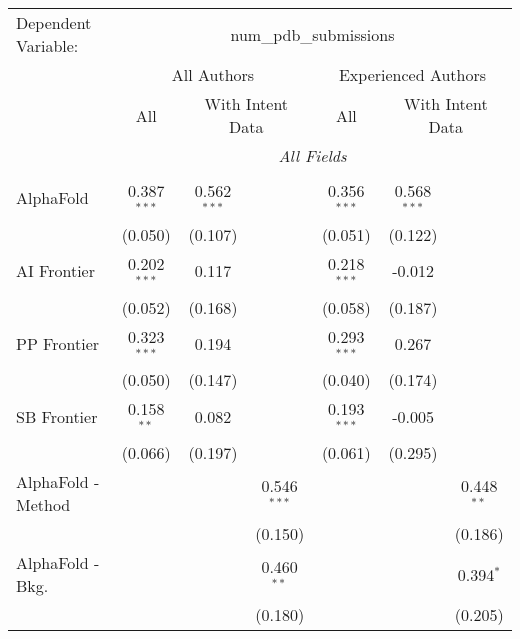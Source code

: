 \begingroup
\centering
\begin{tabular}{lcccccc}
   \tabularnewline \midrule \midrule
   Dependent Variable: & \multicolumn{6}{c}{num\_pdb\_submissions}\\
 & \multicolumn{3}{c}{All Authors} & \multicolumn{3}{c}{Experienced Authors} \\
\cmidrule(lr){2-4} \cmidrule(lr){5-7}
 & \multicolumn{1}{c}{All} & \multicolumn{2}{c}{With Intent Data} & \multicolumn{1}{c}{All} & \multicolumn{2}{c}{With Intent Data} \\
\cmidrule(lr){2-2} \cmidrule(lr){3-4} \cmidrule(lr){5-5} \cmidrule(lr){6-7}
 & \multicolumn{6}{c}{\textit{All Fields}} \\ \\
   AlphaFold            & 0.387$^{***}$ & 0.562$^{***}$ &               & 0.356$^{***}$ & 0.568$^{***}$ &   \\   
                        & (0.050)       & (0.107)       &               & (0.051)       & (0.122)       &   \\   
   AI Frontier          & 0.202$^{***}$ & 0.117         &               & 0.218$^{***}$ & -0.012        &   \\   
                        & (0.052)       & (0.168)       &               & (0.058)       & (0.187)       &   \\   
   PP Frontier          & 0.323$^{***}$ & 0.194         &               & 0.293$^{***}$ & 0.267         &   \\   
                        & (0.050)       & (0.147)       &               & (0.040)       & (0.174)       &   \\   
   SB Frontier          & 0.158$^{**}$  & 0.082         &               & 0.193$^{***}$ & -0.005        &   \\   
                        & (0.066)       & (0.197)       &               & (0.061)       & (0.295)       &   \\   
   AlphaFold - Method   &               &               & 0.546$^{***}$ &               &               & 0.448$^{**}$\\   
                        &               &               & (0.150)       &               &               & (0.186)\\   
   AlphaFold - Bkg.     &               &               & 0.460$^{**}$  &               &               & 0.394$^{*}$\\   
                        &               &               & (0.180)       &               &               & (0.205)\\   

\end{tabular}

